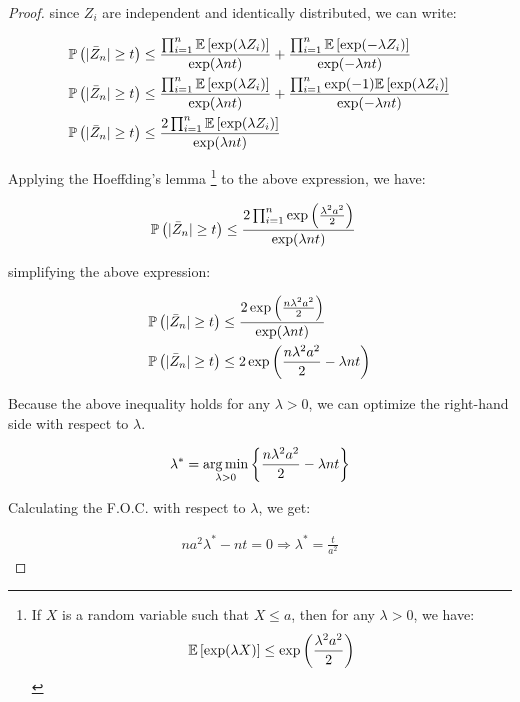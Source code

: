 \begin{proof}
since $Z_i$ are independent and identically distributed, we can write:

\begin{align*}
\mathbb{P}\left(|\bar{Z}_n| \geq t\right) &\leq
    \frac{\prod_{i=1}^n \mathbb{E}\left[\exp(\lambda Z_i)\right]}{\exp(\lambda nt)} + 
    \frac{\prod_{i=1}^n \mathbb{E}\left[\exp(-\lambda Z_i)\right]}{\exp(-\lambda nt)}\\
\mathbb{P}\left(|\bar{Z}_n| \geq t\right) &\leq
    \frac{\prod_{i=1}^n \mathbb{E}\left[\exp(\lambda Z_i)\right]}{\exp(\lambda nt)} + 
    \frac{\prod_{i=1}^n \exp(-1)\mathbb{E}\left[\exp(\lambda Z_i)\right]}{\exp(-\lambda nt)}\\
\mathbb{P}\left(|\bar{Z}_n| \geq t\right) &\leq
    \frac{2 \prod_{i=1}^n \mathbb{E}\left[\exp(\lambda Z_i)\right]}{\exp(\lambda nt)} 
\end{align*}

Applying the Hoeffding's lemma \footnote{
    If $X$ is a random variable such that $X \leq a$, then for any $\lambda > 0$, we have:
    \begin{align*}
    \mathbb{E}\left[\exp(\lambda X)\right] \leq \exp\left(\frac{\lambda^2a^2}{2}\right)
    \end{align*}
} to the above expression, we have:

\begin{align*}
\mathbb{P}\left(|\bar{Z}_n| \geq t\right) &\leq
    \frac{ 2 \prod_{i = 1}^n \exp\left(\frac{\lambda^2a^2}{2}\right)}{\exp(\lambda nt)} 
\end{align*}

simplifying the above expression:

\begin{align*}
\mathbb{P}\left(|\bar{Z}_n| \geq t\right) &\leq
    \frac{2 \exp\left(\frac{n\lambda^2a^2}{2}\right)}{\exp(\lambda nt)}\\
\mathbb{P}\left(|\bar{Z}_n| \geq t\right) &\leq
    2 \exp\left(\frac{n\lambda^2a^2}{2} - \lambda nt \right)\\
\end{align*}

Because the above inequality holds for any $\lambda > 0$, we can optimize the right-hand side with respect to $\lambda$.

\begin{align*}
\lambda^* = \operatorname*{arg\,min}_{\lambda > 0} \left\{ \frac{n\lambda^2a^2}{2} - \lambda nt \right\}
\end{align*}

Calculating the F.O.C. with respect to $\lambda$, we get:

\begin{align*}
n a^2 \lambda^* - nt = 0 \Rightarrow \lambda^* = \frac{t}{a^2}
\end{align*}


\end{proof}
